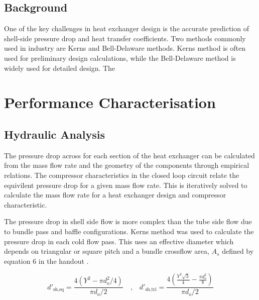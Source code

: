 \documentclass{article}
\begin{document}
\subsection{Background}
One of the key challenges in heat exchanger design is the accurate prediction of shell-side pressure drop and heat transfer coefficients.
Two methods commonly used in industry are Kerns and Bell-Delaware methods.
Kerns method is often used for preliminary design calculations, while the Bell-Delaware method is widely used for detailed design.
The 


\section{Performance Characterisation}

\subsection{Hydraulic Analysis}

The pressure drop across for each section of the heat exchanger can be calculated from the mass flow rate and the geometry of the components through empirical relations.
The compressor characteristics in the closed loop circuit relate the equivilent pressure drop for a given mass flow rate.
This is iteratively solved to calculate the mass flow rate for a heat exchanger design and compressor characteristic.

The pressure drop in shell side flow is more complex than the tube side flow due to bundle pass and baffle configurations.
Kerns method was used to calculate the pressure drop in each cold flow pass.
This uses an effective diameter which depends on triangular or square pitch and a bundle crossflow area, $A_s$ defined by equation 6 in the handout \cite{handout}.

\begin{equation}
  d'_{\text{sh,sq}} = \frac{4(Y^2 - \pi d_o^2/4)}{\pi d_o / 2}  \quad \text{,} \quad d'_{\text{sh,tri}} = \frac{4 \left( \frac{Y^2 \sqrt{3}}{4} - \frac{\pi d_o^2}{8} \right)}{\pi d_o / 2}
\end{equation}
\end{document}
